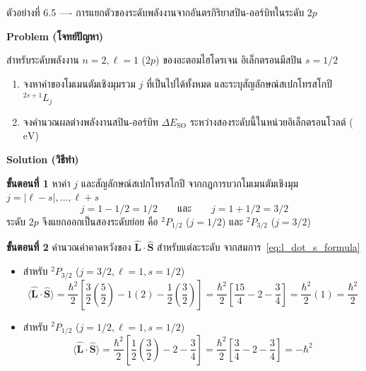 \begin{psctbox}{ตัวอย่างที่ 6.5 ---- การแยกตัวของระดับพลังงานจากอันตรกิริยาสปิน-ออร์บิทในระดับ $2p$}

\textbf{Problem (โจทย์ปัญหา)}

สำหรับระดับพลังงาน $n = 2, \ell = 1$ ($2p$) ของอะตอมไฮโดรเจน อิเล็กตรอนมีสปิน $s = 1/2$
\begin{enumerate}
    \item จงหาค่าของโมเมนตัมเชิงมุมรวม $j$ ที่เป็นไปได้ทั้งหมด และระบุสัญลักษณ์สเปกโทรสโกปี $^{2s+1}L_j$
    \item จงคำนวณผลต่างพลังงานสปิน-ออร์บิท $\Delta E_{\text{SO}}$ ระหว่างสองระดับนี้ในหน่วยอิเล็กตรอนโวลต์ ($\text{eV}$)
\end{enumerate}

\textbf{Solution (วิธีทำ)}

\textbf{ขั้นตอนที่ 1} หาค่า $j$ และสัญลักษณ์สเปกโทรสโกปี
จากกฎการบวกโมเมนตัมเชิงมุม $j = |\ell - s|, \dots, \ell + s$
\begin{equation*}
j = 1 - 1/2 = 1/2 \qquad \text{และ} \qquad j = 1 + 1/2 = 3/2
\end{equation*}
ระดับ $2p$ จึงแยกออกเป็นสองระดับย่อย คือ \textbf{$^2P_{1/2}$} ($j = 1/2$) และ \textbf{$^2P_{3/2}$} ($j = 3/2$)

\textbf{ขั้นตอนที่ 2} คำนวณค่าคาดหวังของ $\hat{\mathbf{L}}\cdot\hat{\mathbf{S}}$ สำหรับแต่ละระดับ
จากสมการ~\eqref{eq:l_dot_s_formula}
\begin{itemize}
    \item สำหรับ $^2P_{3/2}$ ($j = 3/2, \ell = 1, s = 1/2$)
    \begin{equation*}
    \langle \hat{\mathbf{L}}\cdot\hat{\mathbf{S}} \rangle = \frac{\hbar^2}{2} \left[ \frac{3}{2}\left(\frac{5}{2}\right) - 1(2) - \frac{1}{2}\left(\frac{3}{2}\right) \right] = \frac{\hbar^2}{2} \left[ \frac{15}{4} - 2 - \frac{3}{4} \right] = \frac{\hbar^2}{2} (1) = \frac{\hbar^2}{2}
    \end{equation*}
    \item สำหรับ $^2P_{1/2}$ ($j = 1/2, \ell = 1, s = 1/2$)
    \begin{equation*}
    \langle \hat{\mathbf{L}}\cdot\hat{\mathbf{S}} \rangle = \frac{\hbar^2}{2} \left[ \frac{1}{2}\left(\frac{3}{2}\right) - 2 - \frac{3}{4} \right] = \frac{\hbar^2}{2} \left[ \frac{3}{4} - 2 - \frac{3}{4} \right] = -\hbar^2
    \end{equation*}
\end{itemize}


\end{psctbox}
